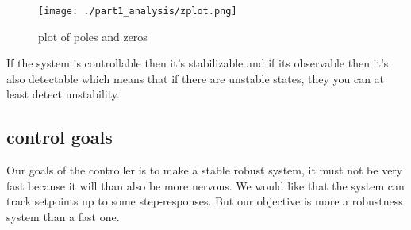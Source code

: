 \begin{figure}[H]
	\centering
	\texttt{[image: ./part1\_analysis/zplot.png]}
	\caption{plot of poles and zeros}
	\label{fig:zplot system}
\end{figure}

If the system is controllable then it's stabilizable and if its observable then it's also detectable which means that if there are unstable states, they you can at least detect unstability.

\subsection{control goals}

Our goals of the controller is to make a stable robust system, it must not be very fast because it will than also be more nervous. We would like that the system can track setpoints up to some step-responses. But our objective is more a robustness system than a fast one.